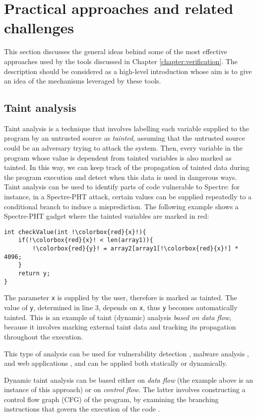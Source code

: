 \documentclass[12pt,a4paper]{book}
\theoremstyle{definition}
\begin{document}
	\section{Practical approaches and related challenges}
	This section discusses the general ideas behind some of the most effective approaches used by the tools discussed in Chapter \ref{chapter:verification}. The description should be considered as a high-level introduction whose aim is to give an idea of the mechanisms leveraged by these tools.
	\subsection{Taint analysis}
	Taint analysis is a technique that involves labelling each variable supplied to the program by an untrusted source as \textit{tainted}, assuming that the untrusted source could be an adversary trying to attack the system.
	Then, every variable in the program whose value is dependent from tainted variables is also marked as tainted. In this way, we can keep track of the propagation of tainted data during the program execution and detect when this data is used in dangerous ways. Taint analysis can be used to identify parts of code vulnerable to Spectre: for instance, in a Spectre-PHT attack, certain values can be supplied repeatedly to a conditional branch to induce a misprediction. The following example shows a Spectre-PHT gadget where the tainted variables are marked in red:
	
	\begin{lstlisting}[escapechar=!]
int checkValue(int !\colorbox{red}{x}!){
	if(!\colorbox{red}{x}! < len(array1)){
		!\colorbox{red}{y}! = array2[array1[!\colorbox{red}{x}!] * 4096;
	}
	return y;
}
	\end{lstlisting}
	The parameter \texttt{x} is supplied by the user, therefore is marked as tainted. The value of \texttt{y}, determined in line 3, depends on \texttt{x}, thus \texttt{y} becomes automatically tainted. This is an example of taint (dynamic) analysis \textit{based on data flow}, because it involves marking external taint data and tracking its propagation throughout the execution.
	
	This type of analysis can be used for vulnerability detection \cite{Newsome2005}, malware analysis \cite{Bayer2009} \cite{Yin2007}, and web applications \cite{Balzarotti2008} \cite{NguyenTuong2005}, and can be applied both statically or dynamically.
	
	Dynamic taint analysis can be based either on \textit{data flow} (the example above is an instance of this approach) or on \textit{control flow}. The latter involves constructing a control flow graph (CFG) of the program, by examining the branching instructions that govern the execution of the code \cite{Dai2018}.
	
\end{document}
